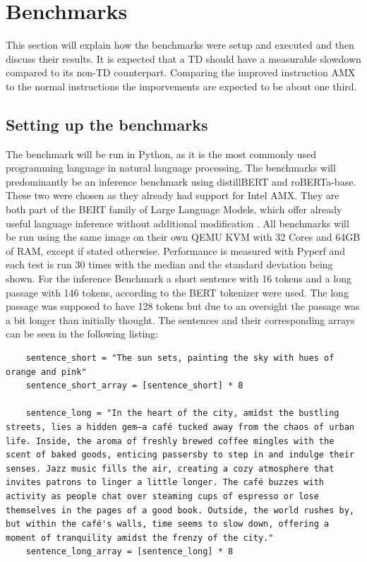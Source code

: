 \section{Benchmarks}

This section will explain how the benchmarks were setup and executed and then discuss their results. It is expected that a TD should have a measurable slowdown compared to its non-TD counterpart. Comparing the improved instruction \Gls{AMX} to the normal instructions the imporvements are expected to be about one third.

\subsection{Setting up the benchmarks}
\label{sec:SecondContent:SecondSection}

The benchmark will be run in Python, as it is the most commonly used programming language in natural language processing. The benchmarks will predominantly be an inference benchmark using distillBERT and roBERTa-base. These two were chosen as they already had support for Intel AMX. They are both part of the BERT family of Large Language Models, which offer already useful language inference without additional modification \cite{devlin_bert_2019}. All benchmarks will be run using the same image on their own QEMU KVM with 32 Cores and 64GB of RAM, except if stated otherwise. Performance is measured with Pyperf and each test is run 30 times with the median and the standard deviation being shown.
For the inference Benchmark a short sentence with 16 tokens and a long passage with 146 tokens, according to the BERT tokenizer were used. The long passage was supposed to have 128 tokens but due to an oversight the passage was a bit longer than initially thought. The sentences and their corresponding arrays can be seen in the following listing:
    \begin{verbatim}
    sentence_short = "The sun sets, painting the sky with hues of orange and pink"
    sentence_short_array = [sentence_short] * 8
    
    sentence_long = "In the heart of the city, amidst the bustling streets, lies a hidden gem—a café tucked away from the chaos of urban life. Inside, the aroma of freshly brewed coffee mingles with the scent of baked goods, enticing passersby to step in and indulge their senses. Jazz music fills the air, creating a cozy atmosphere that invites patrons to linger a little longer. The café buzzes with activity as people chat over steaming cups of espresso or lose themselves in the pages of a good book. Outside, the world rushes by, but within the café's walls, time seems to slow down, offering a moment of tranquility amidst the frenzy of the city."
    sentence_long_array = [sentence_long] * 8
    \end{verbatim}

